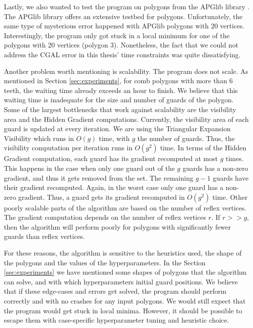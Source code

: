 Lastly, we also wanted to test the program on polygons from the APGlib library \cite{art-gallery-instances-page}. The APGlib library offers an extensive testbed for polygons. Unfortunately, the same type of mysterious error happened with APGlib polygons with 20 vertices. Interestingly, the program only got stuck in a local minimum for one of the polygons with 20 vertices (polygon 3). Nonetheless, the fact that we could not address the CGAL error in this thesis' time constraints was quite dissatisfying.

Another problem worth mentioning is scalability. The program does not scale. As mentioned in Section \ref{sec:experiments}, for comb polygons with more than 6 teeth, the waiting time already exceeds an hour to finish. We believe that this waiting time is inadequate for the size and number of guards of the polygon.
Some of the largest bottlenecks that work against scalability are the visibility area and the Hidden Gradient computations. Currently, the visibility area of each guard is updated at every iteration. We are using the Triangular Expansion Visibility \cite{DBLP:journals/corr/BungiuHHHK14} which runs in $O(g)$ time, with $g$ the number of guards. Thus, the visibility computation per iteration runs in $O(g^2)$ time. 
In terms of the Hidden Gradient computation, each guard has its gradient recomputed at most $g$ times. This happens in the case when only one guard out of the $g$ guards has a non-zero gradient, and thus it gets removed from the set. The remaining $g - 1$ guards have their gradient recomputed. Again, in the worst case only one guard has a non-zero gradient. Thus, a guard gets its gradient recomputed in $O(g^2)$ time.
Other poorly scalable parts of the algorithm are based on the number of reflex vertices. The gradient computation depends on the number of reflex vertices $r$. If $r >> g$, then the algorithm will perform poorly for polygons with significantly fewer guards than reflex vertices.

For these reasons, the algorithm is sensitive to the heuristics used, the shape of the polygons and the values of the hyperparameters. In the Section \ref{sec:experiments} we have mentioned some shapes of polygons that the algorithm can solve, and with which hyperparameters initial guard positions.
We believe that if these edge-cases and errors get solved, the program should perform correctly and with no crashes for any input polygons. We would still expect that the program would get stuck in local minima. However, it should be possible to escape them with case-specific hyperparameter tuning and heuristic choice.





